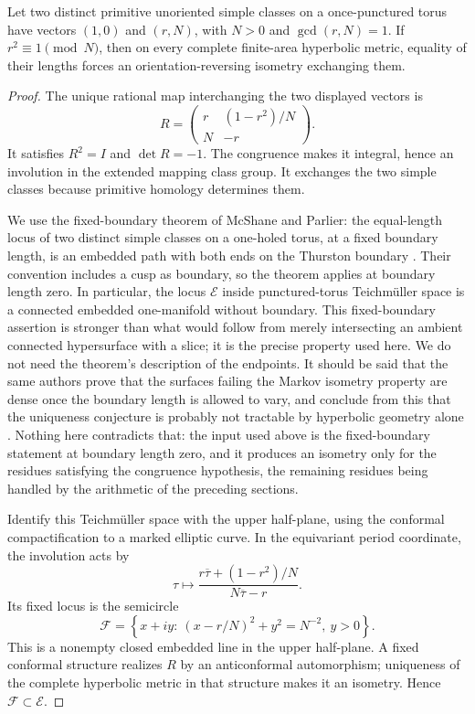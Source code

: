 \begin{lemma}
\label{lem:reflection-residues}
Let two distinct primitive unoriented simple classes on a once-punctured torus have vectors $(1,0)$ and $(r,N)$, with $N>0$ and $\gcd(r,N)=1$. If $r^2\equiv1\pmod N$, then on every complete finite-area hyperbolic metric, equality of their lengths forces an orientation-reversing isometry exchanging them.
\end{lemma}

\begin{proof}
The unique rational map interchanging the two displayed vectors is
\begin{equation}
 R=\begin{pmatrix}r&(1-r^2)/N\\N&-r\end{pmatrix}.
 \label{eq:rigidity-reflection}
\end{equation}
It satisfies $R^2=I$ and $\det R=-1$. The congruence makes it integral, hence an involution in the extended mapping class group. It exchanges the two simple classes because primitive homology determines them.

We use the fixed-boundary theorem of McShane and Parlier: the equal-length locus of two distinct simple classes on a one-holed torus, at a fixed boundary length, is an embedded path with both ends on the Thurston boundary \cite[Theorem~1.3]{McShaneParlier2008}. Their convention includes a cusp as boundary, so the theorem applies at boundary length zero. In particular, the locus $\mathcal E$ inside punctured-torus Teichm\"uller space is a connected embedded one-manifold without boundary. This fixed-boundary assertion is stronger than what would follow from merely intersecting an ambient connected hypersurface with a slice; it is the precise property used here. We do not need the theorem's description of the endpoints. It should be said that the same authors prove that the surfaces failing the Markov isometry property are dense once the boundary length is allowed to vary, and conclude from this that the uniqueness conjecture is probably not tractable by hyperbolic geometry alone \cite[Theorem~1.4]{McShaneParlier2008}. Nothing here contradicts that: the input used above is the fixed-boundary statement at boundary length zero, and it produces an isometry only for the residues satisfying the congruence hypothesis, the remaining residues being handled by the arithmetic of the preceding sections.

Identify this Teichm\"uller space with the upper half-plane, using the conformal compactification to a marked elliptic curve. In the equivariant period coordinate, the involution acts by
$$
 \tau\longmapsto\frac{r\overline\tau+(1-r^2)/N}{N\overline\tau-r}.
$$
Its fixed locus is the semicircle
$$
 \mathcal F=\left\{x+iy:\ (x-r/N)^2+y^2=N^{-2},\ y>0\right\}.
$$
This is a nonempty closed embedded line in the upper half-plane. A fixed conformal structure realizes $R$ by an anticonformal automorphism; uniqueness of the complete hyperbolic metric in that structure makes it an isometry. Hence $\mathcal F\subset\mathcal E$.


\end{proof}
